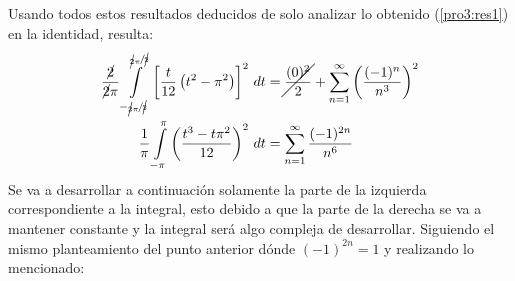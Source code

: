 \begin{multicols}{2}
Usando todos estos resultados deducidos de solo analizar lo obtenido (\ref{pro3:res1}) en la identidad, resulta:
\begin{align*}
    \frac{\cancel{2}}{\cancel{2}\pi} \int\limits_{-\sfrac{\cancel{2}\pi}{\cancel{2}}}^{\sfrac{\cancel{2}\pi}{\cancel{2}}} \left[\frac{t}{12} \left(t^{2} - \pi^{2}\right)\right]^{2} \,dt &= \cancel{\frac{(0)^{2}}{2}} + \sum_{n=1}^{\infty} \left(\frac{(-1)^{n}}{n^{3}}\right)^{2}\\
    \frac{1}{\pi} \int\limits_{-\pi}^{\pi} \left(\frac{t^{3} - t\pi^{2}}{12}\right)^{2} \,dt &= \sum_{n=1}^{\infty} \frac{(-1)^{2n}}{n^{6}}
\end{align*}
Se va a desarrollar a continuación solamente la parte de la izquierda correspondiente a la integral, esto debido a que la parte de la derecha se va a mantener constante y la integral será algo compleja de desarrollar. Siguiendo el mismo planteamiento del punto anterior dónde $(-1)^{2n} = 1$ y realizando lo mencionado:


\end{multicols}
